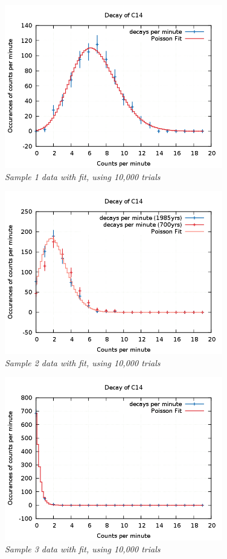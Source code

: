 \documentclass[11pt]{article}
\begin{document}
\begin{figure}[H]
  \begin{center}
\centerline{\includegraphics[width=3.75in]{sample1_10000trials.png}}
\caption{\it \small{Sample 1 data with fit, using 10,000 trials \label{fig9}}}
  \end{center}
\end{figure}

\begin{figure}[H]
  \begin{center}
\centerline{\includegraphics[width=3.75in]{sample2_10000trials.png}}
\caption{\it \small{Sample 2 data with fit, using 10,000 trials \label{fig10}}}
  \end{center}
\end{figure}

\begin{figure}[H]
  \begin{center}
\centerline{\includegraphics[width=3.75in]{sample3_10000trials.png}}
\caption{\it \small{Sample 3 data with fit, using 10,000 trials \label{fig11}}}
  \end{center}
\end{figure}
\end{document}
